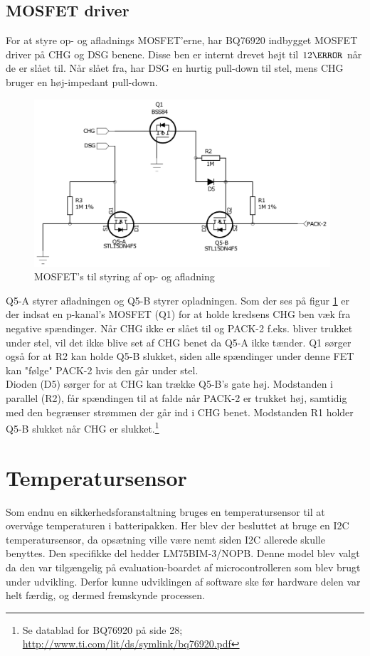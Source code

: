 \subsection{MOSFET driver}
For at styre op- og afladnings MOSFET'erne, har BQ76920 indbygget MOSFET driver på CHG og DSG benene. Disse ben er internt drevet højt til $12\volt$ når de er slået til. Når slået fra, har DSG en hurtig pull-down til stel, mens CHG bruger en høj-impedant pull-down. 

\begin{figure}[h]
	\centering
	\includegraphics[width=11cm]{billeder/bq_fets.png}
	\caption{MOSFET's til styring af op- og afladning}
	\label{fig:bq_fets}
\end{figure}

Q5-A styrer afladningen og Q5-B styrer opladningen. Som der ses på figur \ref{fig:bq_fets} er der indsat en p-kanal's MOSFET (Q1) for at holde kredsens CHG ben væk fra negative spændinger. Når CHG ikke er slået til og PACK-2 f.eks. bliver trukket under stel, vil det ikke blive set af CHG benet da Q5-A ikke tænder. Q1 sørger også for at R2 kan holde Q5-B slukket, siden alle spændinger under denne FET kan "følge" \space PACK-2 hvis den går under stel. \\

Dioden (D5) sørger for at CHG kan trække Q5-B's gate høj. Modstanden i parallel (R2), får spændingen til at falde når PACK-2 er trukket høj, samtidig med den begrænser strømmen der går ind i CHG benet. Modstanden R1 holder Q5-B slukket når CHG er slukket.\footnote{Se datablad for BQ76920 på side 28; \url{http://www.ti.com/lit/ds/symlink/bq76920.pdf}}

\section{Temperatursensor} \label{sec:temperatur}
Som endnu en sikkerhedsforanstaltning bruges en temperatursensor til at overvåge temperaturen i batteripakken. Her blev der besluttet at bruge en I2C temperatursensor, da opsætning ville være nemt siden I2C allerede skulle benyttes. Den specifikke del hedder LM75BIM-3/NOPB. Denne model blev valgt da den var tilgængelig på evaluation-boardet af microcontrolleren som blev brugt under udvikling. Derfor kunne udviklingen af software ske før hardware delen var helt færdig, og dermed fremskynde processen. \\ 

